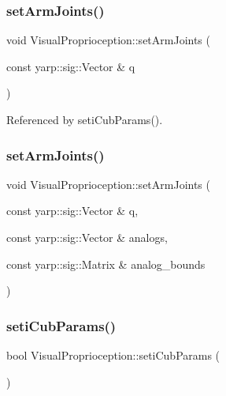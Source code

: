 \subsubsection{\texorpdfstring{set\+Arm\+Joints()}{setArmJoints()}\hspace{0.1cm}{\footnotesize\ttfamily [1/2]}}
{\footnotesize\ttfamily void Visual\+Proprioception\+::set\+Arm\+Joints (\begin{DoxyParamCaption}\item[{const yarp\+::sig\+::\+Vector \&}]{q }\end{DoxyParamCaption})\hspace{0.3cm}{\ttfamily [protected]}}



Referenced by seti\+Cub\+Params().

\mbox{\label{classVisualProprioception_ae701fa6d07822f151bfb2bce4384fb32}} 
\subsubsection{\texorpdfstring{set\+Arm\+Joints()}{setArmJoints()}\hspace{0.1cm}{\footnotesize\ttfamily [2/2]}}
{\footnotesize\ttfamily void Visual\+Proprioception\+::set\+Arm\+Joints (\begin{DoxyParamCaption}\item[{const yarp\+::sig\+::\+Vector \&}]{q,  }\item[{const yarp\+::sig\+::\+Vector \&}]{analogs,  }\item[{const yarp\+::sig\+::\+Matrix \&}]{analog\+\_\+bounds }\end{DoxyParamCaption})\hspace{0.3cm}{\ttfamily [protected]}}

\mbox{\label{classVisualProprioception_a23b9c75f9a3c44442a371676a0379a19}} 
\subsubsection{\texorpdfstring{seti\+Cub\+Params()}{setiCubParams()}}
{\footnotesize\ttfamily bool Visual\+Proprioception\+::seti\+Cub\+Params (\begin{DoxyParamCaption}{ }\end{DoxyParamCaption})\hspace{0.3cm}{\ttfamily [protected]}}




